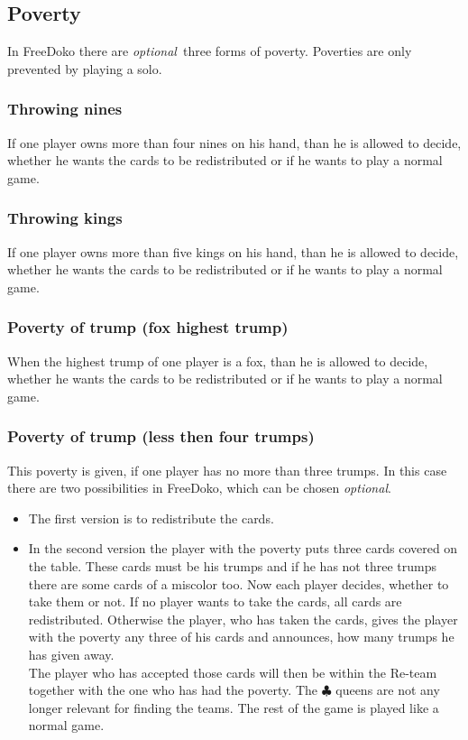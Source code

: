 \documentclass[12pt,a4paper]{article}
\newcommand{\kreuz}{$\clubsuit$}
\newcommand{\optional}{\textit{optional}}
\begin{document}
\subsection{Poverty}
In FreeDoko there are \optional\ three forms of poverty.
Poverties are only prevented by playing a solo.
\subsubsection{Throwing nines}
If one player owns more than four nines on his hand, than he is
allowed to decide, whether he wants the cards to be redistributed
or if he wants to play a normal game.
\subsubsection{Throwing kings}
If one player owns more than five kings on his hand, than he is
allowed to decide, whether he wants the cards to be redistributed
or if he wants to play a normal game.
\subsubsection{Poverty of trump (fox highest trump)}
When the highest trump of one player is a fox, than he is allowed
to decide, whether he wants the cards to be redistributed or if he
wants to play a normal game.
\subsubsection{Poverty of trump (less then four trumps)}
This poverty is given, if one player has no more than three
trumps. In this case there are two possibilities in FreeDoko,
which can be chosen \optional.
\begin{itemize}
\item
The first version is to redistribute the cards.
\item In the
second version the player with the poverty puts three cards
covered on the table. These cards must be his trumps and if he has
not  three trumps there are some cards of a miscolor too. Now
each player decides, whether to take them or not. If no player
wants to take the cards, all cards are redistributed. Otherwise
the player, who has taken the cards, gives the player with the
poverty any three of his cards and announces, how many trumps he has given away.
\\
The player who has accepted those cards will then be within the
Re-team together with the one who has had the poverty. The \kreuz
queens are not any longer relevant for finding the teams. The
rest of the game is played like a normal game.
\end{itemize}
\end{document}
